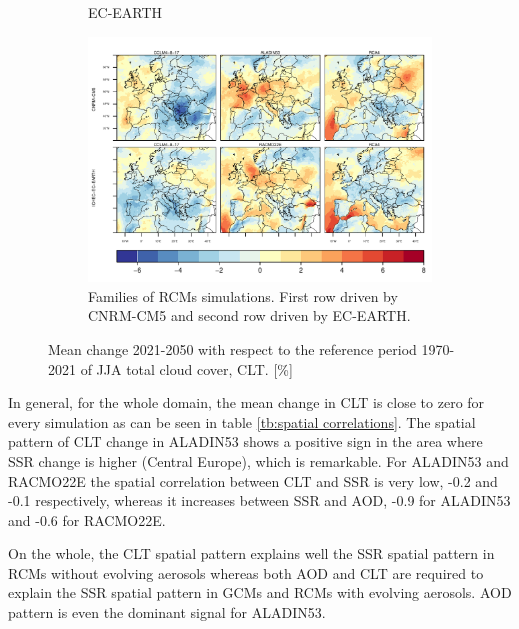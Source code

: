 \begin{figure}[h]
\begin{subfigure}{0.4\textwidth}
    \caption{EC-EARTH}
  \end{subfigure}
  \hspace{0.1mm}
  \centering\begin{subfigure}{1\textwidth}  
    \includegraphics[width=1\textwidth]{figs/capitulo7/ANOMALIAS_JJA_CLT_2050-2021_r12.pdf}
\caption{Families of RCMs simulations. First row driven by CNRM-CM5 and second row driven by EC-EARTH.}
\end{subfigure}
\caption[Change in summer CLT over Europe for the period 2021-2050 with respect of 1971-2000 with different climate models]{Mean change 2021-2050 with respect to the reference period 1970-2021 of JJA total cloud cover, CLT. [\%]}
\label{fig:anomalyCLT}      
\end{figure}

In general, for the whole domain, the mean change in CLT is close to zero for every simulation as can be seen in table \ref{tb:spatial correlations}. The spatial pattern of CLT change in ALADIN53 shows a positive sign in the area where SSR change is higher (Central Europe), which is remarkable. For ALADIN53 and RACMO22E the spatial correlation between CLT and SSR is very low, -0.2 and -0.1 respectively, whereas it increases between SSR and AOD, -0.9 for ALADIN53 and -0.6 for RACMO22E.

On the whole, the CLT spatial pattern explains well the SSR spatial pattern in RCMs without evolving aerosols whereas both AOD and CLT are required to explain the SSR spatial pattern in GCMs and RCMs with evolving aerosols. AOD pattern is even the dominant signal for ALADIN53.



